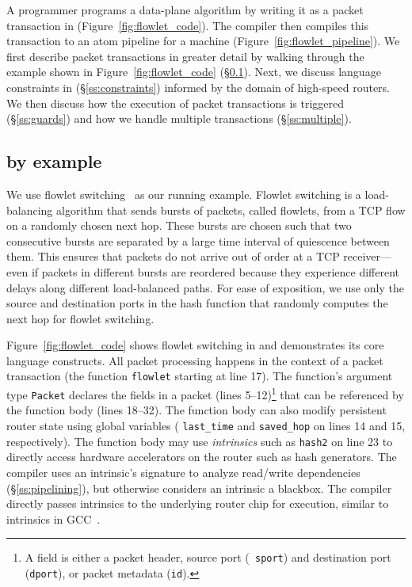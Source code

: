 A programmer programs a data-plane algorithm by writing it as a packet
transaction in \pktlanguage (Figure~\ref{fig:flowlet_code}).  The \pktlanguage
compiler then compiles this transaction to an atom pipeline for a \absmachine
machine (Figure~\ref{fig:flowlet_pipeline}). We first describe packet
transactions in greater detail by walking through the example shown in
Figure~\ref{fig:flowlet_code} (\S\ref{ss:flowlet}). Next, we discuss language
constraints in \pktlanguage (\S\ref{ss:constraints}) informed by the domain of
high-speed routers.  We then discuss how the execution of packet transactions
is triggered (\S\ref{ss:guards}) and how we handle multiple transactions
(\S\ref{ss:multiple}).

\subsection{\pktlanguage by example}
\label{ss:flowlet}

We use flowlet switching~\cite{flowlets} as our running example. Flowlet
switching is a load-balancing algorithm that sends bursts of packets, called
flowlets, from a TCP flow on a randomly chosen next hop. These bursts are
chosen such that two consecutive bursts are separated by a large time interval
of quiescence between them.  This ensures that packets do not arrive out of
order at a TCP receiver---even if packets in different bursts are reordered
because they experience different delays along different load-balanced paths.
For ease of exposition, we use only the source and destination ports in the
hash function that randomly computes the next hop for flowlet switching.

Figure~\ref{fig:flowlet_code} shows flowlet switching in \pktlanguage and
demonstrates its core language constructs. All packet processing happens in the
context of a packet transaction (the function \texttt{flowlet} starting at line
17). The function's argument type {\tt Packet} declares the fields in a packet
(lines 5--12)\footnote{A field is either a packet header, \eg source port ({\tt
sport}) and destination port ({\tt dport}), or packet metadata ({\tt id}).}
that can be referenced by the function body (lines 18--32).  The function body
can also modify persistent router state using global variables (\eg
\texttt{last\_time} and \texttt{saved\_hop} on lines 14 and 15, respectively).
The function body may use \textit{intrinsics} such as \texttt{hash2} on line 23
to directly access hardware accelerators on the router such as hash generators.
The \pktlanguage compiler uses an intrinsic's signature to analyze read/write
dependencies (\S\ref{ss:pipelining}), but otherwise considers an intrinsic a
blackbox. The compiler directly passes intrinsics to the underlying router chip
for execution, similar to intrinsics in GCC~\cite{intrinsics}.


